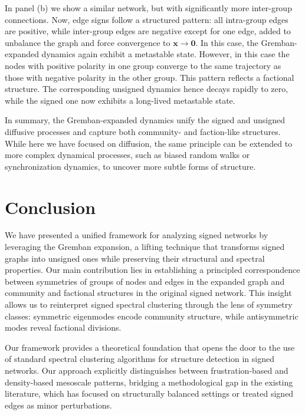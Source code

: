 \documentclass[reprint,onecolumn]{article}
\newcommand{\1}{\mathbb{1}}
\newcommand{\0}{\mathbf{0}}
\begin{document}
In panel (b) we show a similar network, but with significantly more inter-group connections. Now, edge signs follow a structured pattern: all intra-group edges are positive, while inter-group edges are negative except for one edge, added to unbalance the graph and force convergence to $\mathbf{x}\rightarrow\mathbf{0}$.
In this case, the Gremban-expanded dynamics again exhibit a metastable state. However, in this case the nodes with positive polarity in one group converge to the same trajectory as those with negative polarity in the other group. This pattern reflects a factional structure. The corresponding unsigned dynamics hence decays rapidly to zero, while the signed one now exhibits a long-lived metastable state.

In summary, the Gremban-expanded dynamics unify the signed and unsigned diffusive processes and capture both community- and faction-like structures. While here we have focused on diffusion, the same principle can be extended to more complex dynamical processes, such as biased random walks or synchronization dynamics, to uncover more subtle forms of structure.
%
\section{Conclusion}\label{sec:conclusion}
We have presented a unified framework for analyzing signed networks by leveraging the Gremban expansion, a lifting technique that transforms signed graphs into unsigned ones while preserving their structural and spectral properties. Our main contribution lies in establishing a principled correspondence between 
symmetries of groups of nodes and edges in the expanded graph and community and factional structures 
in the original signed network. This insight allows us to reinterpret signed spectral clustering through the lens of symmetry classes: symmetric eigenmodes encode community structure, while antisymmetric modes reveal factional divisions.

Our framework provides a theoretical foundation that opens the door to the use of standard spectral clustering algorithms  for structure detection in signed networks.  Our approach explicitly distinguishes between frustration-based and density-based mesoscale patterns, bridging a methodological gap in the existing literature, which has focused on structurally balanced settings or treated signed edges as minor perturbations.
\end{document}
